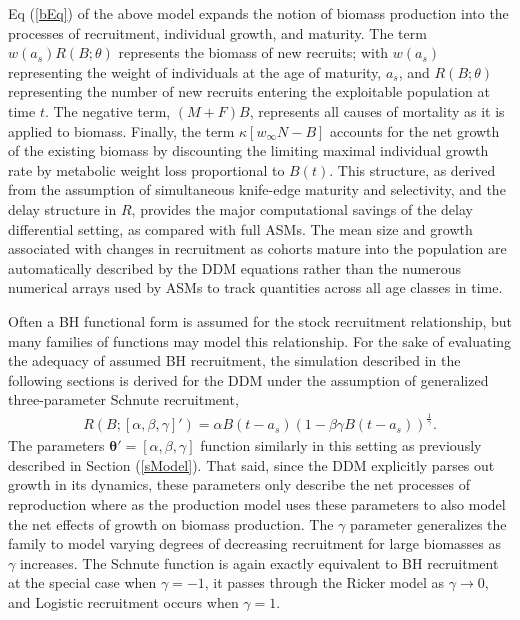 %
Eq (\ref{bEq}) of the above model expands the notion of biomass production into the
processes of recruitment, individual growth, and maturity. The term $w(a_s)R(B;\theta)$
represents the biomass of new recruits; with $w(a_s)$ representing the weight of individuals
at the age of maturity, $a_s$, and $R(B;\theta)$ representing the number of new recruits
entering the exploitable population at time $t$. The negative term, $(M+F)B$, represents all
causes of mortality as it is applied to biomass. Finally, the term $\kappa \left[w_\infty N-B\right]$
accounts for the net growth of the existing biomass by discounting the limiting maximal individual
growth rate by metabolic weight loss proportional to $B(t)$. 
This structure, as derived from the assumption of simultaneous knife-edge maturity and selectivity, and 
the delay structure in $R$, 
provides the major computational savings of the delay differential setting, as
compared with full ASMs. The mean size and growth associated with changes in recruitment as cohorts 
mature into the population are automatically described by the DDM equations rather than the 
numerous numerical arrays used by ASMs to track quantities across all age classes in time.

%
Often a BH functional form is assumed for the stock recruitment relationship, but many %
families of functions may model this relationship. For the sake of evaluating the adequacy
of assumed BH recruitment, the simulation described in the following sections is derived for the 
DDM under the assumption of generalized three-parameter Schnute recruitment,
%
\begin{align}
R(B;[\alpha, \beta, \gamma]') = \alpha B(t-a_s)(1-\beta\gamma B(t-a_s))^{\frac{1}{\gamma}}. \label{srr}
\end{align}
%
The parameters $\bm{\theta}'=[\alpha, \beta, \gamma]$ %
function similarly in this setting as previously described in Section (\ref{sModel}).
That said, since the DDM explicitly parses out growth in its dynamics,
these parameters only describe the net processes of reproduction %
where as the production model uses these parameters to also model the net 
effects of growth on biomass production. %
The $\gamma$ parameter generalizes the family to model varying degrees of
decreasing recruitment for large biomasses as $\gamma$ increases. The Schnute
function is again exactly equivalent to BH recruitment at the special case when
$\gamma=-1$, it passes through the Ricker model as $\gamma\rightarrow0$, and
Logistic recruitment occurs when $\gamma=1$.

